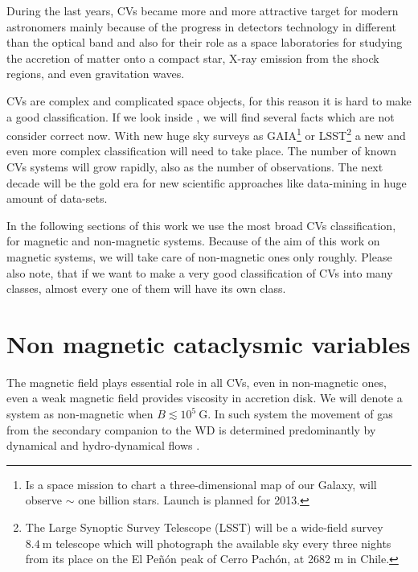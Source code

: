 \documentclass[oneside,a4paper,11pt]{report}
\begin{document}
During the last years, CVs became more and more attractive target for modern astronomers mainly because of  
the progress in detectors technology in different than the optical band and also for their role as a 
space laboratories for studying the accretion of matter onto a compact star, X-ray emission from the shock regions, 
and even gravitation waves. 

CVs are complex and complicated space objects, for this reason it is hard to make a good 
classification. If we look inside \citet{warner:1}, we will find several facts which are not 
consider correct now. With new huge sky surveys as GAIA\footnote{Is a space mission
to chart a three-dimensional map of our Galaxy, will observe $\sim$ one billion stars. Launch is planned for 2013.} 
or LSST\footnote{The Large Synoptic Survey Telescope (LSST) will be a wide-field survey $8.4\: \mathrm{m}$ 
telescope which will photograph the available sky every three nights from its place on the 
El Peñón peak of Cerro Pachón, at 2682 m in Chile. } a new and even more 
complex classification will need to take place.    
The number of known CVs systems will grow rapidly, also as the number of observations. The next decade 
will be the gold era for new scientific approaches like data-mining in huge amount of data-sets.

In the following sections of this work we use the most broad CVs classification, for magnetic and non-magnetic
systems. Because of the aim of this work on magnetic systems, we will take care of non-magnetic ones only  
roughly. Please also note, that if we want to make a very good classification of CVs into many classes, 
almost every one of them will have its own class.  


  
\section{Non magnetic cataclysmic variables} 
The magnetic field plays essential role in all CVs, even in non-magnetic ones, even a weak 
magnetic field provides viscosity in accretion disk. We will denote a system as non-magnetic when 
$B\lesssim10^5 \: \mathrm{G}$. 
In such system the movement of gas from the secondary companion to the WD is determined predominantly 
by dynamical and hydro-dynamical flows \citet{warner:1}.
\end{document}
